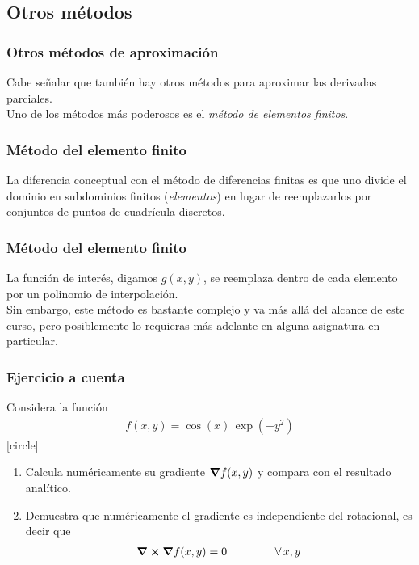 \subsection*{Otros métodos}
\begin{frame}
\frametitle{Otros métodos de aproximación}
Cabe señalar que también hay otros métodos para aproximar las derivadas parciales.
\\
\bigskip
Uno de los métodos más poderosos es el \emph{método de elementos finitos}.
\end{frame}
\begin{frame}
\frametitle{Método del elemento finito}
La diferencia conceptual con el método de diferencias finitas es que uno divide el dominio en subdominios finitos (\emph{elementos}) en lugar de reemplazarlos por conjuntos de puntos de cuadrícula discretos.
\end{frame}
\begin{frame}
\frametitle{Método del elemento finito}
La función de interés, digamos $g(x, y)$, se reemplaza dentro de cada elemento por un polinomio de interpolación.
\\
\bigskip
Sin embargo, este método es bastante complejo y va más allá del alcance de este curso, pero posiblemente lo requieras más adelante en alguna asignatura en particular.
\end{frame}
\begin{frame}
\frametitle{Ejercicio a cuenta}
Considera la función
\begin{align*}
f(x, y) = \cos (x) \, \exp(-y^{2})
\end{align*}
[circle]
\begin{enumerate}[<+->]
\item Calcula numéricamente su gradiente $\grad{f(x, y)}$ y compara con el resultado analítico.
\item Demuestra que numéricamente el gradiente es independiente del rotacional, es decir que 
\begin{align*}
\curl{\grad{f(x, y)}} = 0 \hspace{1.5cm} \forall \, x , y   
\end{align*}
\end{enumerate}
\end{frame}

